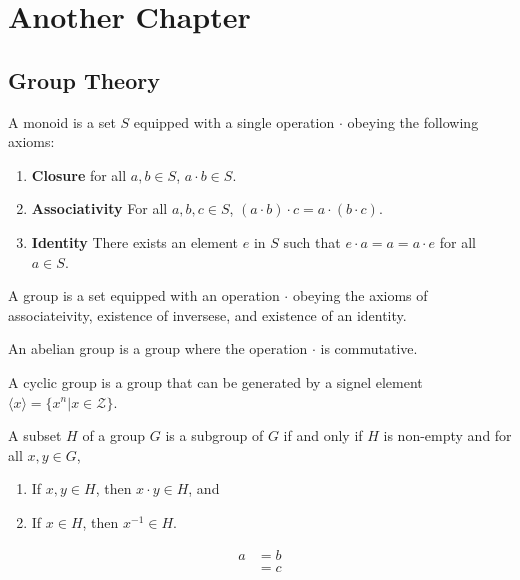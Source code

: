 \chapter{Another Chapter}
\label{cha:another-chapter}

\section{Group Theory}
\label{sec:group-theory}

\begin{defn}
  A monoid is a set $S$ equipped with a single operation $\cdot$
  obeying the following axioms:
  \begin{enumerate}
  \item \textbf{Closure} for all $a, b \in S$, $a \cdot b \in S$.
  \item \textbf{Associativity} For all $a,b,c \in S$, $(a \cdot b)
    \cdot c = a \cdot (b \cdot c)$.
  \item \textbf{Identity} There exists an element $e$ in $S$ such that
    $e \cdot a = a = a \cdot e$ for all $a \in S$.
  \end{enumerate}
\end{defn}

\begin{defn}
  A group is a set equipped with an operation $\cdot$ obeying the
  axioms of associateivity, existence of inversese, and existence of
  an identity.
\end{defn}

\begin{defn}
  An abelian group is a group where the operation $\cdot$ is
  commutative.
\end{defn}

\begin{defn}
  A cyclic group is a group that can be generated by a signel element
  $\langle x \rangle = \{ x^{n} | x \in \mathcal{Z} \}$.
\end{defn}

\begin{defn}
  A subset $H$ of a group $G$ is a subgroup of $G$ if and only if $H$
  is non-empty and for all $x, y \in G$,
  \begin{enumerate}
  \item If $x, y \in H$, then $x \cdot y \in H$, and
  \item If $x \in H$, then $x^{-1} \in H$.
  \end{enumerate}
\end{defn}

\begin{align*}
  a & = b \\
    & = c
\end{align*}

